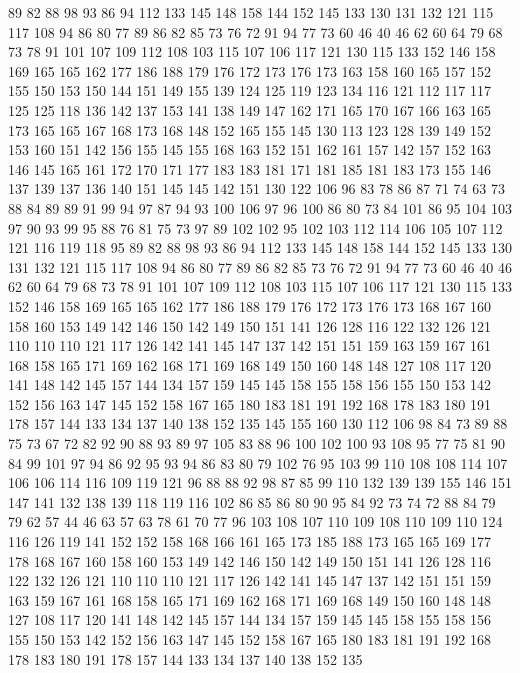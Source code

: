 89 82 88 98 93 86 94 112 133 145 148 158 144 152 145 133 130 131 132 121
115 117 108 94 86 80 77 89 86 82 85 73 76 72 91 94 77 73 60 46
40 46 62 60 64 79 68 73 78 91 101 107 109 112 108 103 115 107 106 117
121 130 115 133 152 146 158 169 165 165 162 177 186 188 179 176 172 173 176 173
163 158 160 165 157 152 155 150 153 150 144 151 149 155 139 124 125 119 123 134
116 121 112 117 117 125 125 118 136 142 137 153 141 138 149 147 162 171 165 170
167 166 163 165 173 165 165 167 168 173 168 148 152 165 155 145 130 113 123 128
139 149 152 153 160 151 142 156 155 145 155 168 163 152 151 162 161 157 142 157
152 163 146 145 165 161 172 170 171 177 183 183 181 171 181 185 181 183 173 155
146 137 139 137 136 140 151 145 145 142 151 130 122 106 96 83 78 86 87 71
74 63 73 88 84 89 89 91 99 94 97 87 94 93 100 106 97 96 100 86
80 73 84 101 86 95 104 103 97 90 93 99 95 88 76 81 75 73 97 89
102 102 95 102 103 112 114 106 105 107 112 121 116 119 118 95 89 82 88 98
93 86 94 112 133 145 148 158 144 152 145 133 130 131 132 121 115 117 108 94
86 80 77 89 86 82 85 73 76 72 91 94 77 73 60 46 40 46 62 60
64 79 68 73 78 91 101 107 109 112 108 103 115 107 106 117 121 130 115 133
152 146 158 169 165 165 162 177 186 188 179 176 172 173 176 173 168 167 160 158
160 153 149 142 146 150 142 149 150 151 141 126 128 116 122 132 126 121 110 110
110 121 117 126 142 141 145 147 137 142 151 151 159 163 159 167 161 168 158 165
171 169 162 168 171 169 168 149 150 160 148 148 127 108 117 120 141 148 142 145
157 144 134 157 159 145 145 158 155 158 156 155 150 153 142 152 156 163 147 145
152 158 167 165 180 183 181 191 192 168 178 183 180 191 178 157 144 133 134 137
140 138 152 135 145 155 160 130 112 106 98 84 73 89 88 75 73 67 72 82
92 90 88 93 89 97 105 83 88 96 100 102 100 93 108 95 77 75 81 90
84 99 101 97 94 86 92 95 93 94 86 83 80 79 102 76 95 103 99 110
108 108 114 107 106 106 114 116 109 119 121 96 88 88 92 98 87 85 99 110
132 139 139 155 146 151 147 141 132 138 139 118 119 116 102 86 85 86 80 90
95 84 92 73 74 72 88 84 79 79 62 57 44 46 63 57 63 78 61 70
77 96 103 108 107 110 109 108 110 109 110 124 116 126 119 141 152 152 158 168
166 161 165 173 185 188 173 165 165 169 177 178 168 167 160 158 160 153 149 142
146 150 142 149 150 151 141 126 128 116 122 132 126 121 110 110 110 121 117 126
142 141 145 147 137 142 151 151 159 163 159 167 161 168 158 165 171 169 162 168
171 169 168 149 150 160 148 148 127 108 117 120 141 148 142 145 157 144 134 157
159 145 145 158 155 158 156 155 150 153 142 152 156 163 147 145 152 158 167 165
180 183 181 191 192 168 178 183 180 191 178 157 144 133 134 137 140 138 152 135
